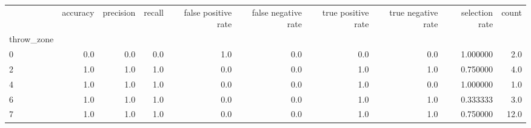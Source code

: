 \begin{tabular}{lrrrrrrrrr}
\toprule
{} &  accuracy &  precision &  recall &  false positive rate &  false negative rate &  true positive rate &  true negative rate &  selection rate &  count \\
throw\_zone &           &            &         &                      &                      &                     &                     &                 &        \\
\midrule
0          &       0.0 &        0.0 &     0.0 &                  1.0 &                  0.0 &                 0.0 &                 0.0 &        1.000000 &    2.0 \\
2          &       1.0 &        1.0 &     1.0 &                  0.0 &                  0.0 &                 1.0 &                 1.0 &        0.750000 &    4.0 \\
4          &       1.0 &        1.0 &     1.0 &                  0.0 &                  0.0 &                 1.0 &                 0.0 &        1.000000 &    1.0 \\
6          &       1.0 &        1.0 &     1.0 &                  0.0 &                  0.0 &                 1.0 &                 1.0 &        0.333333 &    3.0 \\
7          &       1.0 &        1.0 &     1.0 &                  0.0 &                  0.0 &                 1.0 &                 1.0 &        0.750000 &   12.0 \\
\bottomrule
\end{tabular}
